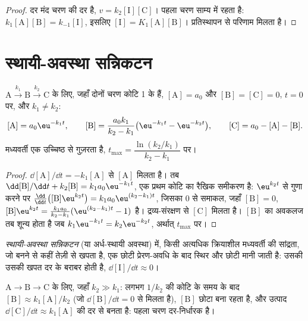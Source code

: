 \begin{proof}
दर मंद चरण की दर है, $v = k_2[\mathrm{I}][\mathrm{C}]$।
पहला चरण साम्य में रहता है: $k_1[\mathrm{A}][\mathrm{B}] =
k_{-1}[\mathrm{I}]$, इसलिए $[\mathrm{I}] = K_1[\mathrm{A}][\mathrm{B}]$।
प्रतिस्थापन से परिणाम मिलता है।
\end{proof}

\section{स्थायी-अवस्था सन्निकटन}

\begin{theorem}[क्रमागत प्रथम कोटि अभिक्रियाएँ]\label{thm:b1:elementary-steps:consecutive}
$\mathrm{A} \xrightarrow{k_1} \mathrm{B} \xrightarrow{k_2} \mathrm{C}$ के लिए,
जहाँ दोनों चरण कोटि 1 के हैं, $[\mathrm{A}] = a_0$ और $[\mathrm{B}] =
[\mathrm{C}] = 0$, $t = 0$ पर, और $k_1 \ne k_2$:
\[
  [\mathrm{A}] = a_0\eu^{-k_1t}, \qquad
  [\mathrm{B}] = \frac{a_0k_1}{k_2 - k_1}\big(\eu^{-k_1t} - \eu^{-k_2t}\big),
  \qquad [\mathrm{C}] = a_0 - [\mathrm{A}] - [\mathrm{B}] .
\]
मध्यवर्ती एक उच्चिष्ठ से गुज़रता है, $t_{\max} = \dfrac{\ln(k_2/k_1)}
{k_2 - k_1}$ पर।
\end{theorem}

\begin{proof}
$\dd[\mathrm{A}]/\dd t = -k_1[\mathrm{A}]$ से $[\mathrm{A}]$ मिलता है। तब
$\dd[\mathrm{B}]/\dd t + k_2[\mathrm{B}] = k_1a_0\eu^{-k_1t}$, एक प्रथम कोटि का
रैखिक समीकरण है: $\eu^{k_2t}$ से गुणा करने पर $\frac{\dd}{\dd t}
\big([\mathrm{B}]\eu^{k_2t}\big) = k_1a_0\eu^{(k_2-k_1)t}$, जिसका
0 से समाकल, जहाँ $[\mathrm{B}] = 0$, $[\mathrm{B}]\eu^{k_2t} =
\frac{k_1a_0}{k_2-k_1}(\eu^{(k_2-k_1)t} - 1)$ है। द्रव्य-संरक्षण से
$[\mathrm{C}]$ मिलता है। $[\mathrm{B}]$ का अवकलज तब शून्य होता है जब $k_1\eu^{-k_1t}
= k_2\eu^{-k_2t}$, अर्थात् $t_{\max}$ पर।
\end{proof}

\begin{definition}\label{def:b1:elementary-steps:qssa}
\emph{स्थायी-अवस्था सन्निकटन}
(या अर्ध-स्थायी अवस्था) में, किसी अत्यधिक
क्रियाशील मध्यवर्ती की सांद्रता, जो बनने से कहीं तेज़ी से खपता है, एक छोटी
प्रेरण-अवधि के बाद स्थिर और छोटी मानी जाती है: उसकी
 उसकी खपत दर के बराबर होती है,
$\dd[\mathrm{I}]/\dd t \approx 0$।
\end{definition}

\begin{proposition}[स्थायी अवस्था कब मान्य है]\label{prop:b1:elementary-steps:qssa-justified}
$\mathrm{A} \to \mathrm{B} \to \mathrm{C}$ के लिए, जहाँ $k_2 \gg k_1$: लगभग
$1/k_2$ की कोटि के समय के बाद $[\mathrm{B}] \approx k_1[\mathrm{A}]/k_2$ (जो
$\dd[\mathrm{B}]/\dd t = 0$ से मिलता है), $[\mathrm{B}]$ छोटा बना रहता है, और
उत्पाद $\dd[\mathrm{C}]/\dd t \approx k_1[\mathrm{A}]$ की दर से बनता है:
पहला चरण दर-निर्धारक है।
\end{proposition}

